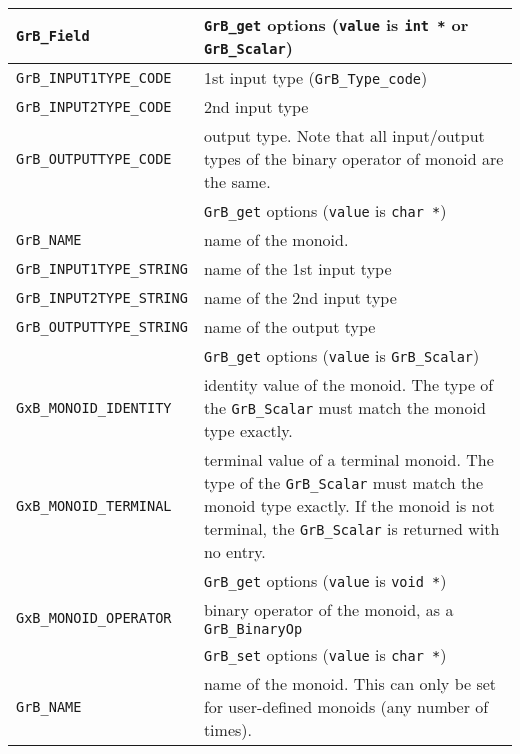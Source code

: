 \noindent
{\small
\begin{tabular}{p{2.2in}p{3.5in}}
\hline
\hline
\verb'GrB_Field'                    & \verb'GrB_get' options (\verb'value' is \verb'int *' or \verb'GrB_Scalar') \\
\hline
\verb'GrB_INPUT1TYPE_CODE'          & 1st input type (\verb'GrB_Type_code') \\
\verb'GrB_INPUT2TYPE_CODE'          & 2nd input type \\
\verb'GrB_OUTPUTTYPE_CODE'          & output type.
Note that all input/output types of the binary operator of monoid are the same. \\
\hline
\hline
                                    & \verb'GrB_get' options (\verb'value' is \verb'char *') \\
\hline
\verb'GrB_NAME'                     & name of the monoid. \\
\verb'GrB_INPUT1TYPE_STRING'        & name of the 1st input type \\
\verb'GrB_INPUT2TYPE_STRING'        & name of the 2nd input type \\
\verb'GrB_OUTPUTTYPE_STRING'        & name of the output type \\
\hline
\hline
                                    & \verb'GrB_get' options (\verb'value' is \verb'GrB_Scalar') \\
\hline
\verb'GxB_MONOID_IDENTITY'          & identity value of the monoid.  The type of the \verb'GrB_Scalar'
                                        must match  the monoid type exactly. \\
\verb'GxB_MONOID_TERMINAL'          & terminal value of a terminal monoid.  The type of the \verb'GrB_Scalar'
                                        must match  the monoid type exactly.  If the monoid is not terminal,
                                        the \verb'GrB_Scalar' is returned with no entry. \\
\hline
\hline
                                    & \verb'GrB_get' options (\verb'value' is \verb'void *') \\
\verb'GxB_MONOID_OPERATOR'          & binary operator of the monoid, as a \verb'GrB_BinaryOp' \\
\hline
\hline
                                    & \verb'GrB_set' options (\verb'value' is \verb'char *') \\
\verb'GrB_NAME'                     & name of the monoid. 
                                        This can only be set for user-defined monoids
                                        (any number of times). \\
\hline
\end{tabular}
}

